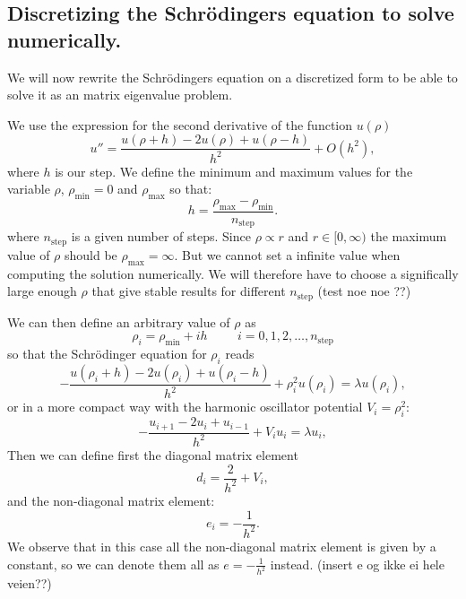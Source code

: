\documentclass[11pt,a4wide]{article}
\begin{document}
\subsection{Discretizing the Schr\"odingers equation to solve numerically.} \label{sec: descrete}
We will now rewrite the Schr\"odingers equation on a discretized form to be able to solve it as an matrix eigenvalue problem.

We use the expression for the second derivative of the function $u(\rho)$
\begin{equation}
    u''=\frac{u(\rho+h) -2u(\rho) +u(\rho-h)}{h^2} +O(h^2),
    \label{eq:diffoperation}
\end{equation} 
where $h$ is our step. We define the minimum and maximum values for the variable $\rho$,
$\rho_{\mathrm{min}}=0$  and $\rho_{\mathrm{max}}$ so that:
\[
  h=\frac{\rho_{\mathrm{max}}-\rho_{\mathrm{min}} }{n_{\mathrm{step}}}.
\]
where $n_{\mathrm{step}}$ is a given number of steps. Since $\rho \propto r$ and $r\in [0,\infty)$ the maximum value of $\rho$ should be $\rho_{\mathrm{max}}=\infty$. But we cannot set a infinite value when computing the solution numerically. We will therefore have to choose a significally large enough $\rho$ that give stable results for different $n_{\mathrm{step}}$ (test noe noe ??)

We can then define an arbitrary value of $\rho$ as 
\[
    \rho_i= \rho_{\mathrm{min}} + ih \hspace{1cm} i=0,1,2,\dots , n_{\mathrm{step}}
\]
so that the Schr\"odinger equation for $\rho_i$ reads
\[
-\frac{u(\rho_i+h) -2u(\rho_i) +u(\rho_i-h)}{h^2}+\rho_i^2u(\rho_i)  = \lambda u(\rho_i),
\]
or in a more compact way with the harmonic oscillator potential $V_i=\rho_i^2$:
\begin{equation}
-\frac{u_{i+1} -2u_i +u_{i-1} }{h^2}+V_iu_i  = \lambda u_i,
\label{eq: sch_discrete_first}
\end{equation}
Then we can define first the diagonal matrix element
\[
   d_i=\frac{2}{h^2}+V_i,
\]
and the non-diagonal matrix element:
\[
   e_i=-\frac{1}{h^2}.
\]
We observe that in this case all the non-diagonal matrix element is given by a constant, so we can denote them all as $e=-\frac{1}{h^2}$ instead. (insert e og ikke ei hele veien??)
 
\end{document}
